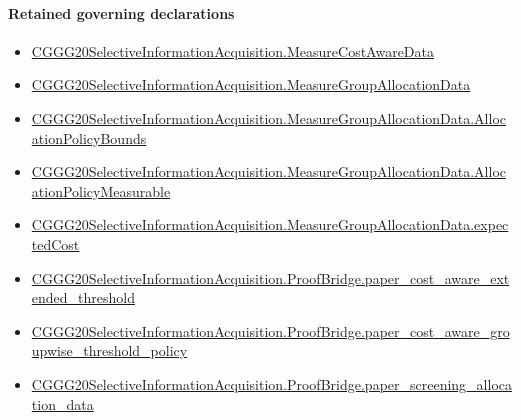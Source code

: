 \documentclass[10pt]{article}
\begin{document}
\paragraph{Retained governing declarations}
\begin{itemize}\raggedright
\item \hyperlink{governing-declaration-254893ae2d19bfc7}{CGGG20\allowbreak{}Selective\allowbreak{}Information\allowbreak{}Acquisition.\allowbreak{}Measure\allowbreak{}Cost\allowbreak{}Aware\allowbreak{}Data}
\item \hyperlink{governing-declaration-da82fc25816f69f3}{CGGG20\allowbreak{}Selective\allowbreak{}Information\allowbreak{}Acquisition.\allowbreak{}Measure\allowbreak{}Group\allowbreak{}Allocation\allowbreak{}Data}
\item \hyperlink{governing-declaration-d8405943feecc63e}{CGGG20\allowbreak{}Selective\allowbreak{}Information\allowbreak{}Acquisition.\allowbreak{}Measure\allowbreak{}Group\allowbreak{}Allocation\allowbreak{}Data.\allowbreak{}Allocation\allowbreak{}Policy\allowbreak{}Bounds}
\item \hyperlink{governing-declaration-bf11c1c6abaaf405}{CGGG20\allowbreak{}Selective\allowbreak{}Information\allowbreak{}Acquisition.\allowbreak{}Measure\allowbreak{}Group\allowbreak{}Allocation\allowbreak{}Data.\allowbreak{}Allocation\allowbreak{}Policy\allowbreak{}Measurable}
\item \hyperlink{governing-declaration-022cbd86b49721b2}{CGGG20\allowbreak{}Selective\allowbreak{}Information\allowbreak{}Acquisition.\allowbreak{}Measure\allowbreak{}Group\allowbreak{}Allocation\allowbreak{}Data.\allowbreak{}expected\allowbreak{}Cost}
\item \hyperlink{governing-declaration-32adde700de18806}{CGGG20\allowbreak{}Selective\allowbreak{}Information\allowbreak{}Acquisition.\allowbreak{}Proof\allowbreak{}Bridge.\allowbreak{}paper\_\allowbreak{}cost\_\allowbreak{}aware\_\allowbreak{}extended\_\allowbreak{}threshold}
\item \hyperlink{governing-declaration-96f5a6a5bcc3fdd9}{CGGG20\allowbreak{}Selective\allowbreak{}Information\allowbreak{}Acquisition.\allowbreak{}Proof\allowbreak{}Bridge.\allowbreak{}paper\_\allowbreak{}cost\_\allowbreak{}aware\_\allowbreak{}groupwise\_\allowbreak{}threshold\_\allowbreak{}policy}
\item \hyperlink{governing-declaration-aef8d61af2db4aea}{CGGG20\allowbreak{}Selective\allowbreak{}Information\allowbreak{}Acquisition.\allowbreak{}Proof\allowbreak{}Bridge.\allowbreak{}paper\_\allowbreak{}screening\_\allowbreak{}allocation\_\allowbreak{}data}

\end{itemize}
\end{document}
